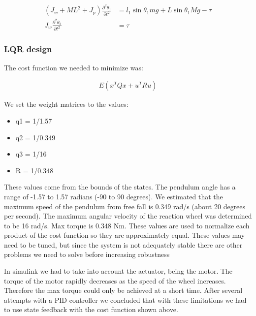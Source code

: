 \documentclass[a4paper]{article}
\begin{document}
\newpage

\begin{equation}
		\begin{aligned}
	     	 (J_{w}+ML^2 + J_{p} ) \frac{\partial^2 \theta_{1} }{\partial t^2}  &= l_{1} \sin{\theta_{1}} m g + L \sin{\theta_{1}} M g - \tau    \\  
		 J_{w} \frac{\partial^2 \theta_{2}} {\partial t^2} &= \tau
		\end{aligned}
	 	\label{equ:inverted_pendulum}  
\end{equation}

\subsubsection{LQR design}

The cost function we needed to minimize was:

\begin{equation}
		\begin{aligned}
	     	 E(x^TQx + u^TRu)
		\end{aligned}
	 	\label{equ:inverted_pendulum}  
\end{equation}


We set the weight matrices to the values:

\begin{itemize}

\item[] q1 = 1/1.57
\item[] q2 = 1/0.349
\item[] q3 = 1/16
\item[] R = 1/0.348

\end{itemize}


These values come from the bounds of the states. The pendulum angle has a range of -1.57 to 1.57 radians (-90 to 90 degrees). We estimated that the maximum speed of the pendulum from free fall is 0.349 rad/s (about 20 degrees per second). The maximum angular velocity of the reaction wheel was determined to be 16 rad/s. Max torque is 0.348 Nm.
These values are used to normalize each product of the cost function so they are approximately equal. These values may need to be tuned, but since the system is not adequately stable there are other problems we need to solve before increasing robustness

In simulink we had to take into account the actuator, being the motor. The torque of the motor rapidly decreases as the speed of the wheel increases. Therefore the max torque could only be achieved at a short time. After several attempts with a PID controller we concluded that with these limitations we had to use state feedback with the cost function shown above.
\end{document}
